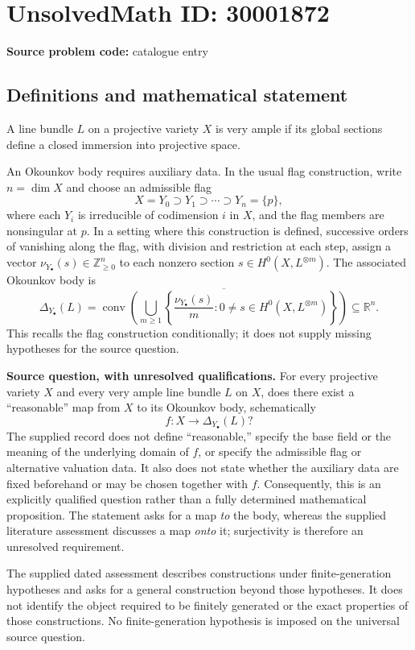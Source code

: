 \documentclass[11pt]{article}
\newcommand{\Z}{\mathbb{Z}}
\newcommand{\R}{\mathbb{R}}
\begin{document}
\section*{UnsolvedMath ID: 30001872}
\textbf{Source problem code:} catalogue entry
\subsection{Definitions and mathematical statement}
A line bundle \(L\) on a projective variety \(X\) is very ample if its global sections define a closed immersion into projective space.

An Okounkov body requires auxiliary data. In the usual flag construction, write \(n=\dim X\) and choose an admissible flag
\[
X=Y_0\supset Y_1\supset\cdots\supset Y_n=\{p\},
\]
where each \(Y_i\) is irreducible of codimension \(i\) in \(X\), and the flag members are nonsingular at \(p\). In a setting where this construction is defined, successive orders of vanishing along the flag, with division and restriction at each step, assign a vector \(\nu_{Y_\bullet}(s)\in\Z_{\geq 0}^{n}\) to each nonzero section \(s\in H^0(X,L^{\otimes m})\). The associated Okounkov body is
\[
\Delta_{Y_\bullet}(L)
=
\overline{\operatorname{conv}\!\left(
\bigcup_{m\geq 1}
\left\{\frac{\nu_{Y_\bullet}(s)}{m}:
0\neq s\in H^0(X,L^{\otimes m})\right\}
\right)}\subseteq\R^n.
\]
This recalls the flag construction conditionally; it does not supply missing hypotheses for the source question.

\textbf{Source question, with unresolved qualifications.} For every projective variety \(X\) and every very ample line bundle \(L\) on \(X\), does there exist a ``reasonable'' map from \(X\) to its Okounkov body, schematically
\[
f\colon X\longrightarrow\Delta_{Y_\bullet}(L)?
\]
The supplied record does not define ``reasonable,'' specify the base field or the meaning of the underlying domain of \(f\), or specify the admissible flag or alternative valuation data. It also does not state whether the auxiliary data are fixed beforehand or may be chosen together with \(f\). Consequently, this is an explicitly qualified question rather than a fully determined mathematical proposition. The statement asks for a map \emph{to} the body, whereas the supplied literature assessment discusses a map \emph{onto} it; surjectivity is therefore an unresolved requirement.

The supplied dated assessment describes constructions under finite-generation hypotheses and asks for a general construction beyond those hypotheses. It does not identify the object required to be finitely generated or the exact properties of those constructions. No finite-generation hypothesis is imposed on the universal source question.
\end{document}
